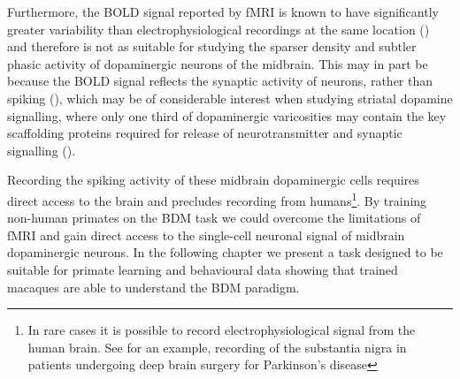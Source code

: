 Furthermore, the BOLD signal reported by fMRI is known to have significantly greater variability than electrophysiological recordings at the same location (\cite{logothetisUnderpinningsBOLDFunctional2003}) and therefore is not as suitable for studying the sparser density and subtler phasic activity of dopaminergic neurons of the midbrain. This may in part be because the BOLD signal reflects the synaptic activity of neurons, rather than spiking (\cite{viswanathanNeurometabolicCouplingCerebral2007}), which may be of considerable interest when studying striatal dopamine signalling, where only one third of dopaminergic varicosities may contain the key scaffolding proteins required for release of neurotransmitter and synaptic signalling (\cite{liuDopamineSecretionMediated2018}).

Recording the spiking activity of these midbrain dopaminergic cells requires direct access to the brain and precludes recording from humans\footnote{In rare cases it is possible to record electrophysiological signal from the human brain. See \cite{zaghloulHumanSubstantiaNigra2009} for an example, recording of the substantia nigra in patients undergoing deep brain surgery for Parkinson's disease}. By training non-human primates on the BDM task we could overcome the limitations of fMRI and gain direct access to the single-cell neuronal signal of midbrain dopaminergic neurons. In the following chapter we present a task designed to be suitable for primate learning and behavioural data showing that trained macaques are able to understand the BDM paradigm.